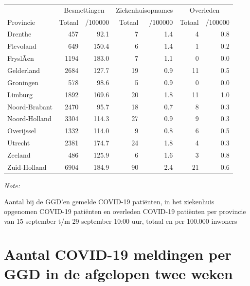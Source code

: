 \documentclass[
  english,
  man,floatsintext]{apa6}
\begin{document}
\begin{table}
\centering
\begin{threeparttable}
\begin{tabular}{lrrrrrr}
\toprule
\multicolumn{1}{c}{ } & \multicolumn{2}{c}{Besmettingen} & \multicolumn{2}{c}{Ziekenhuisopnames} & \multicolumn{2}{c}{Overleden} \\
\cmidrule(l{3pt}r{3pt}){2-3} \cmidrule(l{3pt}r{3pt}){4-5} \cmidrule(l{3pt}r{3pt}){6-7}
Provincie & Totaal & /100000 & Totaal & /100000 & Totaal & /100000\\
\midrule
Drenthe & 457 & 92.1 & 7 & 1.4 & 4 & 0.8\\
Flevoland & 649 & 150.4 & 6 & 1.4 & 1 & 0.2\\
FryslÃ¢n & 1194 & 183.0 & 7 & 1.1 & 0 & 0.0\\
Gelderland & 2684 & 127.7 & 19 & 0.9 & 11 & 0.5\\
Groningen & 578 & 98.6 & 5 & 0.9 & 0 & 0.0\\
Limburg & 1892 & 169.6 & 20 & 1.8 & 11 & 1.0\\
Noord-Brabant & 2470 & 95.7 & 18 & 0.7 & 8 & 0.3\\
Noord-Holland & 3304 & 114.3 & 27 & 0.9 & 9 & 0.3\\
Overijssel & 1332 & 114.0 & 9 & 0.8 & 6 & 0.5\\
Utrecht & 2381 & 174.7 & 24 & 1.8 & 4 & 0.3\\
Zeeland & 486 & 125.9 & 6 & 1.6 & 3 & 0.8\\
Zuid-Holland & 6904 & 184.9 & 90 & 2.4 & 21 & 0.6\\
\bottomrule
\end{tabular}
\begin{tablenotes}
\item \textit{Note: } 
\item Aantal bij de GGD’en gemelde COVID-19 patiënten, in het ziekenhuis opgenomen COVID-19 patiënten en overleden COVID-19 patiënten per provincie van 15 september t/m 29 september 10:00 uur, totaal en per 100.000 inwoners
\end{tablenotes}
\end{threeparttable}
\end{table}

\newpage

\hypertarget{aantal-covid-19-meldingen-per-ggd-in-de-afgelopen-twee-weken}{%
\section{Aantal COVID-19 meldingen per GGD in de afgelopen twee weken}\label{aantal-covid-19-meldingen-per-ggd-in-de-afgelopen-twee-weken}}
\end{document}
